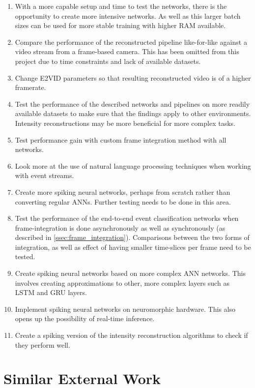 \begin{enumerate}
    \item With a more capable setup and time to test the networks, there is the opportunity to create more intensive networks. As well as this larger batch sizes can be used for more stable training with higher RAM available.
    \item Compare the performance of the reconstructed pipeline like-for-like against a video stream from a frame-based camera. This has been omitted from this project due to time constraints and lack of available datasets.
    \item Change E2VID parameters so that resulting reconstructed video is of a higher framerate.
    \item Test the performance of the described networks and pipelines on more readily available datasets to make sure that the findings apply to other environments. Intensity reconstructions may be more beneficial for more complex tasks.
    \item Test performance gain with custom frame integration method with all networks.
    \item Look more at the use of natural language processing techniques when working with event streams.
    \item Create more spiking neural networks, perhaps from scratch rather than converting regular ANNs. Further testing needs to be done in this area.
    \item Test the performance of the end-to-end event classification networks when frame-integration is done asynchronously as well as synchronously (as described in \cref{ssec:frame_integration}). Comparisons between the two forms of integration, as well as effect of having smaller time-slices per frame need to be tested.
    \item Create spiking neural networks based on more complex ANN networks. This involves creating approximations to other, more complex layers such as LSTM and GRU layers.
    \item Implement spiking neural networks on neuromorphic hardware. This also opens up the possibility of real-time inference.
    \item Create a spiking version of the intensity reconstruction algorithms to check if they perform well.
\end{enumerate}

\section{Similar External Work}

